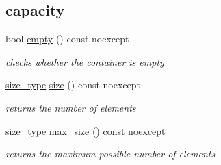 \subsection*{capacity}
\begin{DoxyCompactItemize}
\item 
bool \mbox{\hyperlink{classnlohmann_1_1basic__json_a1a86d444bfeaa9518d2421aedd74444a}{empty}} () const noexcept
\begin{DoxyCompactList}\small\item\em checks whether the container is empty \end{DoxyCompactList}\item 
\mbox{\hyperlink{classnlohmann_1_1basic__json_a39f2cd0b58106097e0e67bf185cc519b}{size\+\_\+type}} \mbox{\hyperlink{classnlohmann_1_1basic__json_a25e27ad0c6d53c01871c5485e1f75b96}{size}} () const noexcept
\begin{DoxyCompactList}\small\item\em returns the number of elements \end{DoxyCompactList}\item 
\mbox{\hyperlink{classnlohmann_1_1basic__json_a39f2cd0b58106097e0e67bf185cc519b}{size\+\_\+type}} \mbox{\hyperlink{classnlohmann_1_1basic__json_a2f47d3c6a441c57dd2be00449fbb88e1}{max\+\_\+size}} () const noexcept
\begin{DoxyCompactList}\small\item\em returns the maximum possible number of elements \end{DoxyCompactList}\end{DoxyCompactItemize}
